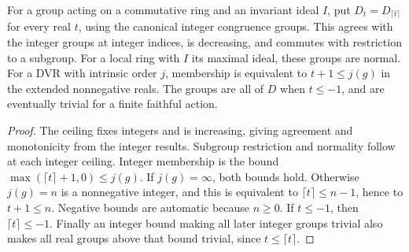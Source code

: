 \begin{lemma}
\label{fw:real-lower-groups}
\leanok
For a group acting on a commutative ring and an invariant ideal $I$,
put $D_t=D_{\lceil t\rceil}$ for every real $t$, using the canonical
integer congruence groups. This agrees with the integer groups at
integer indices, is decreasing, and commutes with restriction to a
subgroup. For a local ring with $I$ its maximal ideal, these groups are
normal. For a DVR with intrinsic order $j$, membership is equivalent to
$t+1\leq j(g)$ in the extended nonnegative reals. The groups are all of
$D$ when $t\leq-1$, and are eventually trivial for a finite faithful action.
\end{lemma}
\begin{proof}
The ceiling fixes integers and is increasing, giving agreement and
monotonicity from the integer results. Subgroup restriction and normality
follow at each integer ceiling. Integer membership is the bound
$\max(\lceil t\rceil+1,0)\leq j(g)$. If $j(g)=\infty$, both bounds hold.
Otherwise $j(g)=n$ is a nonnegative integer, and this is equivalent to
$\lceil t\rceil\leq n-1$, hence to $t+1\leq n$. Negative bounds are
automatic because $n\geq0$. If $t\leq-1$, then $\lceil t\rceil\leq-1$.
Finally an integer bound making all later integer groups trivial also
makes all real groups above that bound trivial, since $t\leq\lceil t\rceil$.
\end{proof}

